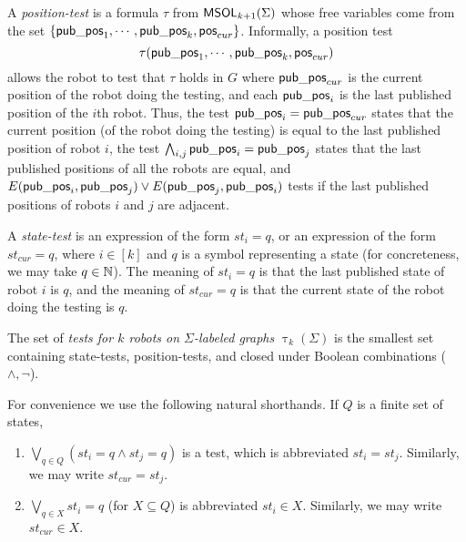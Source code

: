 

 A {\em position-test} is a formula $\tau$ from $\mathsf{MSOL}_{k+1}(\Sigma)$ whose free variables come from the set 
 $\{\mathsf{pub\_pos}_1, \cdots, \mathsf{pub\_pos}_k,\mathsf{pos}_{cur}\}$. Informally, a position test
  \[
\tau(\mathsf{pub\_pos}_1,\cdots,\mathsf{pub\_pos}_k,\mathsf{pos}_{cur})  
 \]
allows the robot to test that $\tau$ holds in $G$
 where $\mathsf{pub\_pos}_{cur}$ is the current position of the robot doing the testing, and each $\mathsf{pub\_pos}_i$ is the last published position of the $i$th robot.
 Thus, the test $\mathsf{pub\_pos}_i = \mathsf{pub\_pos}_{cur}$ states that the current position (of the robot doing the testing) is equal to the last published position of robot $i$,
 the test $\bigwedge_{i,j} \mathsf{pub\_pos}_i = \mathsf{pub\_pos}_j$ states that the last published positions of all the robots are equal,
 and $E(\mathsf{pub\_pos}_i,\mathsf{pub\_pos}_j) \vee E(\mathsf{pub\_pos}_j,\mathsf{pub\_pos}_i)$ tests if the last published positions of robots $i$ and $j$ are adjacent.

 A {\em state-test} is an expression of the form $st_i = q$, or an expression of the form $st_{cur} = q$, where $i \in [k]$ and $q$ is a symbol representing a state (for concreteness, we may take $q \in \mathbb{N}$).
 The meaning of $st_i = q$ is that
 the last published state of robot $i$ is $q$, and the meaning of $st_{cur} = q$ is that the current state of the robot doing the testing is $q$.

 The set of \emph{tests for $k$ robots on $\Sigma$-labeled graphs} $\uptau_k(\Sigma)$ is the smallest set containing state-tests, position-tests, and closed under Boolean combinations ($\wedge,\neg$).

 For convenience we use the following natural shorthands. If $Q$ is a finite set of states,
 \begin{enumerate}
  \item $\bigvee_{q\in Q} (st_i = q \wedge st_j = q)$ is a test, which is abbreviated $st_i = st_j$. Similarly, we may write $st_{cur} = st_j$.
  \item $\bigvee_{q \in X} st_i = q$ (for $X \subseteq Q$) is abbreviated $st_i \in X$. Similarly, we may write $st_{cur} \in X$.
 \end{enumerate}



